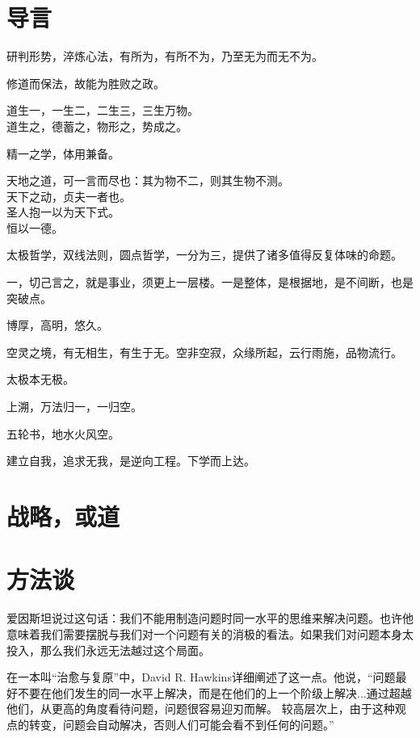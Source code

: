 \section{导言}

研判形势，淬炼心法，有所为，有所不为，乃至无为而无不为。

修道而保法，故能为胜败之政。

\begin{shadequote}

    道生一，一生二，二生三，三生万物。\\
    道生之，德蓄之，物形之，势成之。
\end{shadequote}

精一之学，体用兼备。
\begin{shadequote}

    天地之道，可一言而尽也：其为物不二，则其生物不测。\\
    天下之动，贞夫一者也。\\
    圣人抱一以为天下式。\\
    恒以一德。
\end{shadequote}

太极哲学，双线法则，圆点哲学，一分为三，提供了诸多值得反复体味的命题。

一，切己言之，就是事业，须更上一层楼。一是整体，是根据地，是不间断，也是突破点。

博厚，高明，悠久。

空灵之境，有无相生，有生于无。空非空寂，众缘所起，云行雨施，品物流行。

太极本无极。

上溯，万法归一，一归空。

五轮书，地水火风空。

建立自我，追求无我，是逆向工程。下学而上达。

\section{战略，或道}

\section{方法谈}

爱因斯坦说过这句话：我们不能用制造问题时同一水平的思维来解决问题。也许他意味着我们需要摆脱与我们对一个问题有关的消极的看法。如果我们对问题本身太投入，那么我们永远无法越过这个局面。

在一本叫“治愈与复原”中，David R. Hawkins详细阐述了这一点。他说，“问题最好不要在他们发生的同一水平上解决，而是在他们的上一个阶级上解决...通过超越他们，从更高的角度看待问题，问题很容易迎刃而解。
较高层次上，由于这种观点的转变，问题会自动解决，否则人们可能会看不到任何的问题。”

